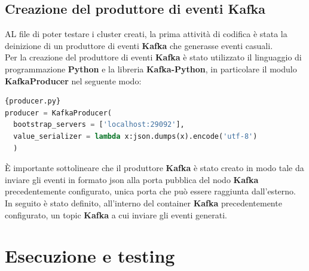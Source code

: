 \subsection{Creazione del produttore di eventi Kafka}
AL file di poter testare i \gls{cluster}{} creati, la prima attività di codifica è stata la deinizione di
un produttore di eventi \textbf{Kafka} che generasse eventi casuali.\\
Per la creazione del produttore di eventi \textbf{Kafka} è stato utilizzato il linguaggio di programmazione \textbf{Python} e la libreria \textbf{Kafka-Python}, in particolare il modulo \textbf{KafkaProducer} nel seguente modo:
\begin{lstlisting}[language=Python, caption=\texttt{producer.py}, label=lst:file]{producer.py}
producer = KafkaProducer(  
  bootstrap_servers = ['localhost:29092'],  
  value_serializer = lambda x:json.dumps(x).encode('utf-8')  
  )  
\end{lstlisting}
È importante sottolineare che il produttore \textbf{Kafka} è stato creato in modo tale da inviare gli eventi in formato \gls{json}{} alla porta pubblica 
del nodo \textbf{Kafka} precedentemente configurato, unica porta che può essere raggiunta dall'esterno.\\
In seguito è stato definito, all'interno del \gls{container}{} \textbf{Kafka} precedentemente configurato, un \gls{topic}{} \textbf{Kafka} a cui inviare gli eventi generati.
\section{Esecuzione e testing}

\newpage
\pagestyle{empty}
\null %
\newpage